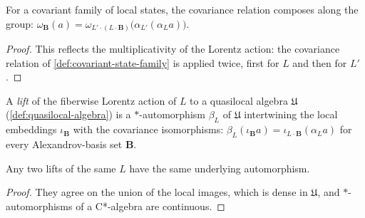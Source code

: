 \begin{lemma}
    \label{lmm:covariant-state-family-compose}
    \leanok
    For a covariant family of local states, the covariance relation composes along the group: $\omega_{\mathbf{B}}(a) = \omega_{L'\cdot(L\cdot\mathbf{B})}\big(\alpha_{L'}(\alpha_L a)\big)$.
\end{lemma}
\begin{proof}
    \leanok
    This reflects the multiplicativity of the Lorentz action: the covariance relation of \ref{def:covariant-state-family} is applied twice, first for $L$ and then for $L'$.
\end{proof}

\begin{definition}
    \label{def:quasilocal-lift}
    \leanok
    A \emph{lift} of the fiberwise Lorentz action of $L$ to a quasilocal algebra $\mathfrak{U}$ (\ref{def:quasilocal-algebra}) is a $*$-automorphism $\beta_L$ of $\mathfrak{U}$ intertwining the local embeddings $\iota_{\mathbf{B}}$ with the covariance isomorphisms: $\beta_L(\iota_{\mathbf{B}} a) = \iota_{L\cdot\mathbf{B}}(\alpha_L a)$ for every Alexandrov-basis set $\mathbf{B}$.
\end{definition}

\begin{lemma}
    \label{lmm:quasilocal-lift-unique}
    \leanok
    Any two lifts of the same $L$ have the same underlying automorphism.
\end{lemma}
\begin{proof}
    \leanok
    They agree on the union of the local images, which is dense in $\mathfrak{U}$, and $*$-automorphisms of a C*-algebra are continuous.
\end{proof}

